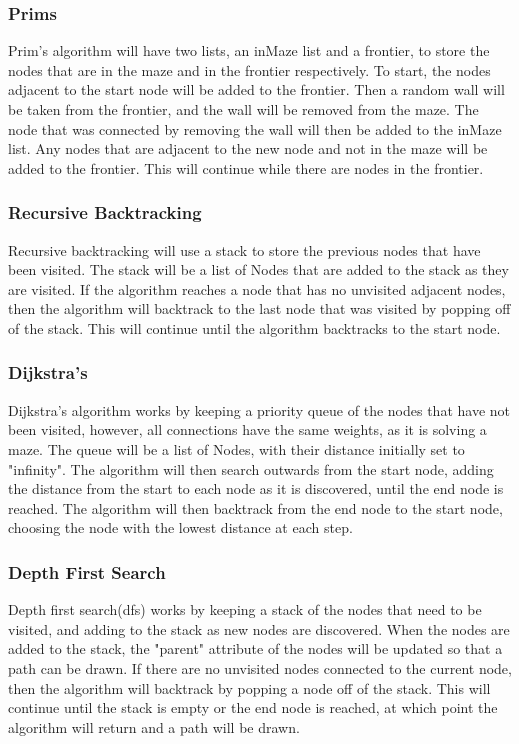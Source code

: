 \documentclass[titlepage]{article}
\begin{document}
\subsubsection{Prims}
Prim's algorithm will have two lists, an inMaze list and a frontier, to store the nodes that are in the maze and in the frontier respectively. To start, the nodes adjacent to the start node will be added to the frontier. Then a random wall will be taken from the frontier, and the wall will be removed from the maze. The node that was connected by removing the wall will then be added to the inMaze list. Any nodes that are adjacent to the new node and not in the maze will be added to the frontier. This will continue while there are nodes in the frontier.

\subsubsection{Recursive Backtracking}
Recursive backtracking will use a stack to store the previous nodes that have been visited. The stack will be a list of Nodes that are added to the stack as they are visited. If the algorithm reaches a node that has no unvisited adjacent nodes, then the algorithm will backtrack to the last node that was visited by popping off of the stack. This will continue until the algorithm backtracks to the start node.

\subsubsection{Dijkstra's}
Dijkstra's algorithm works by keeping a priority queue of the nodes that have not been visited, however, all connections have the same weights, as it is solving a maze. The queue will be a list of Nodes, with their distance initially set to "infinity". The algorithm will then search outwards from the start node, adding the distance from the start to each node as it is discovered, until the end node is reached. The algorithm will then backtrack from the end node to the start node, choosing the node with the lowest distance at each step.

\subsubsection{Depth First Search}
Depth first search(dfs) works by keeping a stack of the nodes that need to be visited, and adding to the stack as new nodes are discovered. When the nodes are added to the stack, the "parent" attribute of the nodes will be updated so that a path can be drawn. If there are no unvisited nodes connected to the current node, then the algorithm will backtrack by popping a node off of the stack. This will continue until the stack is empty or the end node is reached, at which point the algorithm will return and a path will be drawn.
\end{document}
